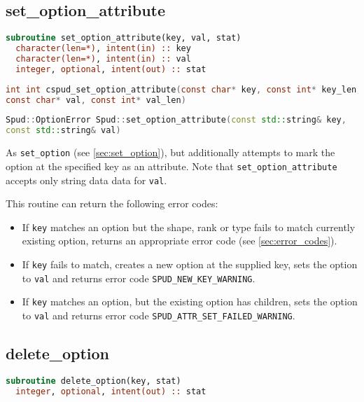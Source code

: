 \documentclass[a4paper, 11pt]{book}
\begin{document}
\subsection{set\_option\_attribute}

\begin{lstlisting}[language=fortran]
subroutine set_option_attribute(key, val, stat)
  character(len=*), intent(in) :: key
  character(len=*), intent(in) :: val
  integer, optional, intent(out) :: stat
\end{lstlisting}

\begin{lstlisting}[language=C]
int int cspud_set_option_attribute(const char* key, const int* key_len,
const char* val, const int* val_len)
\end{lstlisting}

\begin{lstlisting}[language=C++]
Spud::OptionError Spud::set_option_attribute(const std::string& key,
const std::string& val)
\end{lstlisting}

As \lstinline+set_option+ (see \ref{sec:set_option}), but additionally attempts
to mark the option at the specified key as an attribute. Note that
\lstinline+set_option_attribute+ accepts only string data data for
\lstinline+val+.

This routine can return the following error codes:
\begin{itemize}
\item If \lstinline+key+ matches an option but the shape, rank or type fails
  to match currently existing option, returns an appropriate error code (see
  \ref{sec:error_codes}).
\item If \lstinline+key+ fails to match, creates a new option at the supplied
  key, sets the option to \lstinline+val+ and returns error code
  \lstinline+SPUD_NEW_KEY_WARNING+.
\item If \lstinline+key+ matches an option, but the existing option has
  children, sets the option to \lstinline+val+ and returns error code
  \lstinline+SPUD_ATTR_SET_FAILED_WARNING+.
\end{itemize}

\subsection{delete\_option}

\begin{lstlisting}[language=fortran]
subroutine delete_option(key, stat)
  integer, optional, intent(out) :: stat
\end{lstlisting}
\end{document}
